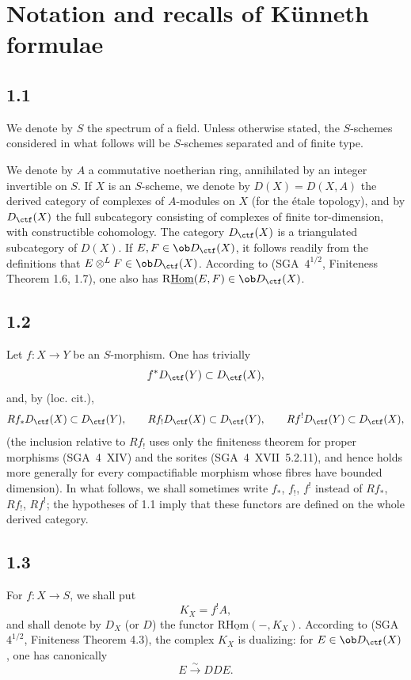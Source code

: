 \setcounter{section}{0}
\section{Notation and recalls of Künneth formulae}

\subsection*{1.1}
We denote by $S$ the spectrum of a field. Unless otherwise stated, the $S$-schemes considered in what follows will be $S$-schemes separated and of finite type.

We denote by $A$ a commutative noetherian ring, annihilated by an integer invertible on $S$. If $X$ is an $S$-scheme, we denote by $D(X)=D(X,A)$ the derived category of complexes of $A$-modules on $X$ (for the étale topology), and by $D_{\ctf}(X)$ the full subcategory consisting of complexes of finite tor-dimension, with constructible cohomology. The category $D_{\ctf}(X)$ is a triangulated subcategory of $D(X)$. If $E,F\in\ob D_{\ctf}(X)$, it follows readily from the definitions that $E\otimes^L F\in\ob D_{\ctf}(X)$. According to (SGA~$4^{1/2}$, Finiteness Theorem 1.6, 1.7), one also has $\mathrm{R}\underline{\mathrm{Hom}}(E,F)\in\ob D_{\ctf}(X)$.

\subsection*{1.2}
Let $f:X\to Y$ be an $S$-morphism. One has trivially
\[
f^{*}D_{\ctf}(Y) \subset D_{\ctf}(X),
\]
and, by (loc. cit.),
\[
Rf_{*}D_{\ctf}(X) \subset D_{\ctf}(Y),\qquad
Rf_{!}D_{\ctf}(X) \subset D_{\ctf}(Y),\qquad
Rf^{!}D_{\ctf}(Y) \subset D_{\ctf}(X),
\]
(the inclusion relative to $Rf_{!}$ uses only the finiteness theorem for proper morphisms (SGA~4~XIV) and the sorites (SGA~4~XVII~5.2.11), and hence holds more generally for every compactifiable morphism whose fibres have bounded dimension). In what follows, we shall sometimes write $f_{*}$, $f_{!}$, $f^{!}$ instead of $Rf_{*}$, $Rf_{!}$, $Rf^{!}$; the hypotheses of 1.1 imply that these functors are defined on the whole derived category.

\subsection*{1.3}
For $f:X\to S$, we shall put
\[
K_X=f^{!}A,
\]
and shall denote by $D_X$ (or $D$) the functor $\mathrm{R}\underline{\mathrm{Hom}}(-,K_X)$. According to (SGA~$4^{1/2}$, Finiteness Theorem 4.3), the complex $K_X$ is dualizing: for $E\in\ob D_{\ctf}(X)$, one has canonically
\[
E \xrightarrow{\sim} DDE.
\]

